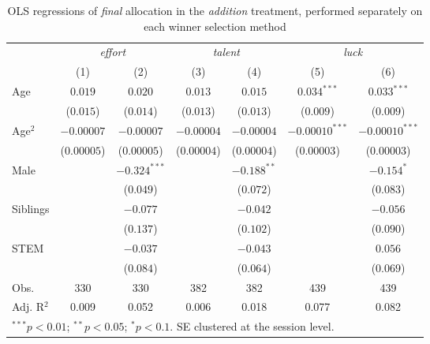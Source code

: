\begin{table}[htpb]
\centering
\footnotesize
\begin{tabular}{l cc cc cc}
\toprule
 & \multicolumn{2}{c}{\textit{effort}} & \multicolumn{2}{c}{\textit{talent}} & \multicolumn{2}{c}{\textit{luck}} \\
\cmidrule(lr){2-3} \cmidrule(lr){4-5} \cmidrule(lr){6-7}
 & (1) & (2) & (3) & (4) & (5) & (6) \\
\midrule
Age & $0.019$ & $0.020$ & $0.013$ & $0.015$ & $0.034^{***}$ & $0.033^{***}$ \\
        & ($0.015$) & ($0.014$) & ($0.013$) & ($0.013$) & ($0.009$) & ($0.009$) \\
Age$^2$ & $-0.00007$ & $-0.00007$ & $-0.00004$ & $-0.00004$ & $-0.00010^{***}$ & $-0.00010^{***}$ \\
        & ($0.00005$) & ($0.00005$) & ($0.00004$) & ($0.00004$) & ($0.00003$) & ($0.00003$) \\
Male &  & $-0.324^{***}$ &  & $-0.188^{**}$ &  & $-0.154^{*}$ \\
        &  & ($0.049$) &  & ($0.072$) &  & ($0.083$) \\
Siblings &  & $-0.077$ &  & $-0.042$ &  & $-0.056$ \\
        &  & ($0.137$) &  & ($0.102$) &  & ($0.090$) \\
STEM &  & $-0.037$ &  & $-0.043$ &  & $0.056$ \\
        &  & ($0.084$) &  & ($0.064$) &  & ($0.069$) \\
\midrule
Obs. & 330 & 330 & 382 & 382 & 439 & 439 \\
Adj. R$^2$ & 0.009 & 0.052 & 0.006 & 0.018 & 0.077 & 0.082 \\
\bottomrule
\multicolumn{7}{l}{\footnotesize $^{***}p<0.01$; $^{**}p<0.05$; $^{*}p<0.1$. SE clustered at the session level.}
\end{tabular}
\caption{OLS regressions of \textit{final} allocation in the \textit{addition} treatment, performed separately on each winner selection method}
\label{table-b6}
\end{table}
